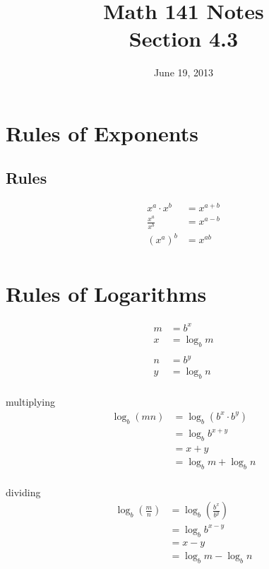 \documentclass{exam}
\title{Math 141 Notes \\ Section 4.3}
\date{June 19, 2013}
\begin{document}
  \maketitle
  \tableofcontents

  \section{Rules of Exponents}

  \subsection{Rules}
  \begin{align*}
    x^a \cdot x^b        &= x^{a + b} \\
    \frac{x^a}{x^b}      &= x^{a - b} \\
    \left( x^a \right)^b &= x^{ab} \\
  \end{align*}

  \section{Rules of Logarithms}

  \begin{align*}
    m &= b^x \\
    x &= \log_b m \\
    \\
    n &= b^y \\
    y &= \log_b n \\
  \end{align*}

  multiplying
  \begin{align*}
    \log_b \left( mn \right) &= \log_b \left( b^x \cdot b^y \right) \\
                             &= \log_b b^{x + y} \\
                             &= x + y \\
                             &= \log_b m + \log_b n \\
  \end{align*}

  dividing
  \begin{align*}
    \log_b \left( \frac{m}{n} \right) &= \log_b \left( \frac{b^x}{b^y} \right) \\
                             &= \log_b b^{x - y} \\
                             &= x - y \\
                             &= \log_b m - \log_b n \\
  \end{align*}
\end{document}
